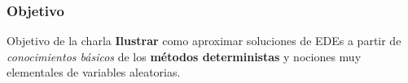  \begin{frame}
 	\frametitle{Objetivo}
 	\begin{alertblock}{Objetivo de la charla}
 		\textbf{Ilustrar} como aproximar soluciones de EDEs  a partir de
 \emph{conocimientos básicos}
 		de los \textbf{métodos deterministas} y nociones muy elementales de
variables 		 aleatorias.
 	\end{alertblock}
 \end{frame}
